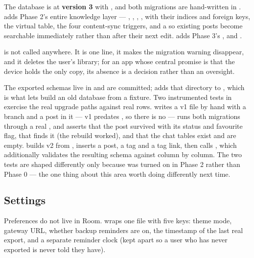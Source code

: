 The database is at \textbf{version 3} with , and both migrations are
hand-written in .  adds Phase 2's entire knowledge layer
--- , , , ,  with their
indices and foreign keys, the  virtual table, the four content-sync triggers, and a
 so existing posts become searchable immediately rather than after their next edit.
 adds Phase 3's ,  and
.

 is not called anywhere. It is one line, it makes the
migration warning disappear, and it deletes the user's library; for an app whose central promise is
that the device holds the only copy, its absence is a decision rather than an oversight.

The exported schemas live in  and
are committed;  adds that directory to , which is
what lets  build an old database from a fixture. Two instrumented tests in
 exercise the real
upgrade paths against real rows.  writes a v1 file by hand with a
branch and a post in it --- v1 predates , so there is no  --- runs
both migrations through a real , and asserts that the post survived with
its status and favourite flag, that  finds it (the rebuild worked),
and that the chat tables exist and are empty.  builds v2 from
, inserts a post, a tag and a tag link, then calls
, which additionally validates the
resulting schema against  column by column. The two tests are shaped differently only
because  was turned on in Phase 2 rather than Phase 0 --- the one thing about this
area worth doing differently next time.

\subsection{Settings}

Preferences do not live in Room.  wraps one
 file with five keys: theme mode, gateway URL, whether backup reminders are
on, the timestamp of the last real export, and a separate reminder clock (kept apart so a user who
has never exported is never told they have).


